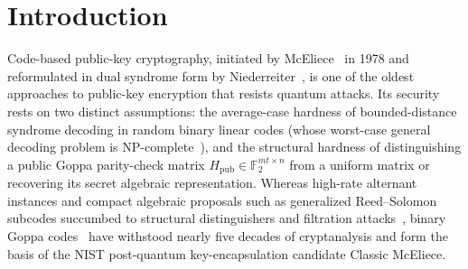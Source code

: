\documentclass[11pt,a4paper]{article}
\theoremstyle{definition}
\theoremstyle{remark}
\newcommand{\F}{\mathbb{F}}
\begin{document}
\section{Introduction}
\label{sec:intro}

Code-based public-key cryptography, initiated by McEliece~\cite{McE78} in 1978 and reformulated in dual syndrome form by Niederreiter~\cite{Nie86}, is one of the oldest approaches to public-key encryption that resists quantum attacks. Its security rests on two distinct assumptions: the average-case hardness of bounded-distance syndrome decoding in random binary linear codes (whose worst-case general decoding problem is NP-complete~\cite{BMvT78}), and the structural hardness of distinguishing a public Goppa parity-check matrix $H_{\text{pub}} \in \F_2^{mt \times n}$ from a uniform matrix or recovering its secret algebraic representation. Whereas high-rate alternant instances and compact algebraic proposals such as generalized Reed--Solomon subcodes succumbed to structural distinguishers and filtration attacks~\cite{FGOPT13,CGGOT14}, binary Goppa codes~\cite{Pat75,MS77} have withstood nearly five decades of cryptanalysis and form the basis of the NIST post-quantum key-encapsulation candidate Classic McEliece.
\end{document}
